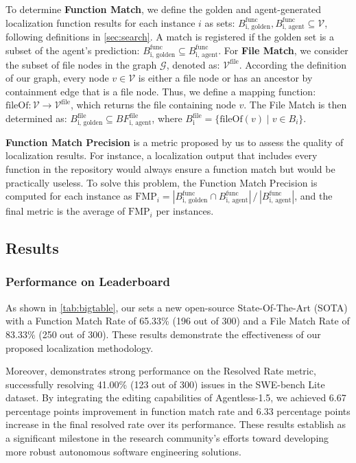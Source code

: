 To determine \textbf{Function Match}, we define the golden and agent-generated localization function results for each instance $i$ as sets:
$B_{\text{i, golden}}^{\text{func}}, B_{\text{i, agent}}^{\text{func}} \subseteq \mathcal{V}$, following definitions in \cref{sec:search}.
A match is registered if the golden set is a subset of the agent's prediction:
$B_{\text{i, golden}}^{\text{func}} \subseteq B_{\text{i, agent}}^{\text{func}}$.
For \textbf{File Match}, we consider the subset of file nodes in the graph $\mathcal{G}$, denoted as:
$\mathcal{V}^{\text{file}}$.
According the definition of our graph, every node $v \in \mathcal{V}$ is either a file node or has an ancestor by containment edge that is a file node. Thus, we define a mapping function:
$\text{fileOf}: \mathcal{V} \to \mathcal{V}^{\text{file}}$,
which returns the file containing node $v$. The File Match is then determined as:
$B_{\text{i, golden}}^{\text{file}} \subseteq BF_{\text{i, agent}}^{\text{file}}$, where $B_{\text{i}}^{\text{file}} = \{ \text{fileOf}(v) \mid v \in B_i \}$.


\item \textbf{Function Match Precision} is a metric proposed by us to assess the quality of localization results. For instance, a localization output that includes every function in the repository would always ensure a function match but would be practically useless. To solve this problem, the Function Match Precision is computed for each instance as $\text{FMP}_i = |B_{\text{i, golden}}^{\text{func}} \cap B_{\text{i, agent}}^{\text{func}}| \,/\, |B_{\text{i, agent}}^{\text{func}}|$, and the final metric is the average of $\text{FMP}_i$ per instances.
\squishend


\subsection{Results}

\subsubsection{Performance on Leaderboard}

As shown in \cref{tab:bigtable}, our \nickname sets a new open-source State-Of-The-Art (SOTA) with a Function Match Rate of 65.33\% (196 out of 300) and a File Match Rate of 83.33\% (250 out of 300). These results demonstrate the effectiveness of our proposed localization methodology.

Moreover, \nickname demonstrates strong performance on the Resolved Rate metric, successfully resolving 41.00\% (123 out of 300) issues in the SWE-bench Lite dataset. By integrating the editing capabilities of Agentless-1.5, we achieved 6.67 percentage points improvement in function match rate and 6.33 percentage points increase in the final resolved rate over its performance. These results establish \nickname as a significant milestone in the research community's efforts toward developing more robust autonomous software engineering solutions.

